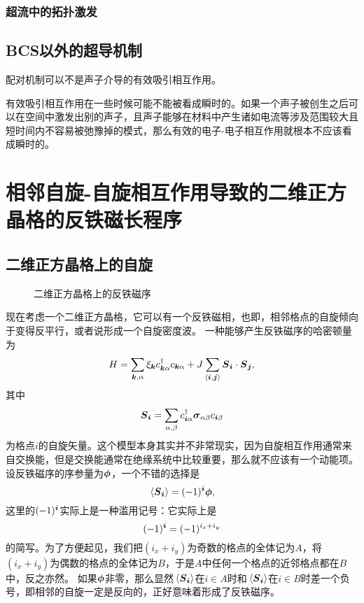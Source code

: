 \subsubsection{超流中的拓扑激发}

\subsection{BCS以外的超导机制}

配对机制可以不是声子介导的有效吸引相互作用。

有效吸引相互作用在一些时候可能不能被看成瞬时的。如果一个声子被创生之后可以在空间中激发出别的声子，且声子能够在材料中产生诸如电流等涉及范围较大且短时间内不容易被弛豫掉的模式，那么有效的电子-电子相互作用就根本不应该看成瞬时的。

\section{相邻自旋-自旋相互作用导致的二维正方晶格的反铁磁长程序}\label{sec:spin-spin-nn-interaction-sdw}

\subsection{二维正方晶格上的自旋}

\begin{figure}
    \centering
    \subfigure[自旋密度波]{
              
    }
    \subfigure[SDW形成后的两条子格子]{
        
    }
    \caption{二维正方晶格上的反铁磁序}
\end{figure}

现在考虑一个二维正方晶格，它可以有一个反铁磁相，也即，相邻格点的自旋倾向于变得反平行，或者说形成一个自旋密度波。
一种能够产生反铁磁序的哈密顿量为
\begin{equation}
    {H} = \sum_{\vb*{k}, \alpha} \xi_{\vb*{k}} {c}_{\vb*{k} \alpha}^\dagger {c}_{\vb*{k} \alpha} + J \sum_{\langle \vb*{i}, \vb*{j} \rangle} {\vb*{S}}_{\vb*{i}} \cdot {\vb*{S}}_{\vb*{j}},
    \label{eq:2dim-square-spin}
\end{equation}
其中
\begin{equation}
    {\vb*{S}}_{\vb*{i}} = \sum_{\alpha, \beta} {c}^\dagger_{\vb*{i} \alpha} \vb*{\sigma}_{\alpha \beta} {c}_{\vb*{i} \beta}
    \label{eq:spin-wave-order-parameter}
\end{equation}
为格点$i$的自旋矢量。这个模型本身其实并不非常现实，因为自旋相互作用通常来自交换能，但是交换能通常在绝缘系统中比较重要，那么就不应该有一个动能项。
设反铁磁序的序参量为$\vb*{\phi}$，一个不错的选择是
\begin{equation}
    \expval*{{\vb*{S}}_{\vb*{i}}} = (-1)^{\vb*{i}} \vb*{\phi},
\end{equation}
这里的$(-1)^{\vb*{i}}$实际上是一种滥用记号：它实际上是
\[
    (-1)^{\vb*{i}} = (-1)^{i_x + i_y}
\]
的简写。为了方便起见，我们把$(i_x + i_y)$为奇数的格点的全体记为$A$，将$(i_x + i_y)$为偶数的格点的全体记为$B$，于是$A$中任何一个格点的近邻格点都在$B$中，反之亦然。
如果$\vb*{\phi}$非零，那么显然$\expval*{{\vb*{S}}_{\vb*{i}}}$在$i \in A$时和$\expval*{{\vb*{S}}_{\vb*{i}}}$在$i \in B$时差一个负号，即相邻的自旋一定是反向的，正好意味着形成了反铁磁序。

